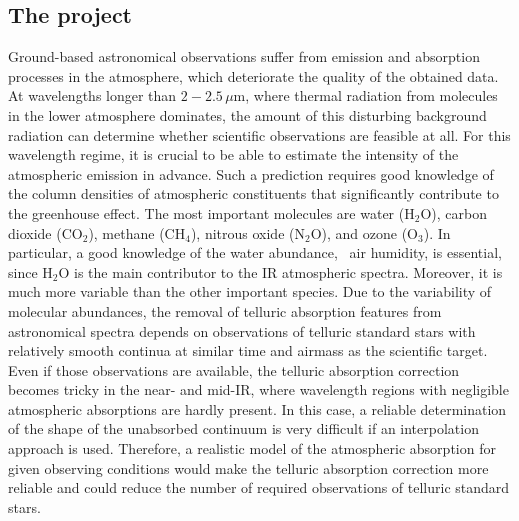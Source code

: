 \subsection{The project}\label{sec:project}
Ground-based astronomical observations suffer from emission and absorption
processes in the atmosphere, which deteriorate the quality of the obtained
data. At wavelengths longer than $2 - 2.5$\,$\mu$m, where thermal radiation
from molecules in the lower atmosphere dominates, the amount of this disturbing
background radiation can determine whether scientific observations are feasible
at all. For this wavelength regime, it is crucial to be able to estimate the
intensity of the atmospheric emission in advance. Such a prediction requires
good knowledge of the column densities of atmospheric constituents that
significantly contribute to the greenhouse effect. The most important molecules
are water (H$_2$O), carbon dioxide (CO$_2$), methane (CH$_4$), nitrous oxide
(N$_2$O), and ozone (O$_3$). In particular, a good knowledge of the water
abundance, \ie\ air humidity, is essential, since H$_2$O is the main
contributor to the IR atmospheric spectra. Moreover, it is much more variable
than the other important species. Due to the variability of molecular
abundances, the removal of telluric absorption features from astronomical
spectra depends on observations of telluric standard stars with relatively
smooth continua at similar time and airmass as the scientific target. Even if
those observations are available, the telluric absorption correction becomes
tricky in the near- and mid-IR, where wavelength regions with negligible
atmospheric absorptions are hardly present. In this case, a reliable
determination of the shape of the unabsorbed continuum is very difficult if
an interpolation approach is used. Therefore, a realistic model of the
atmospheric absorption for given observing conditions would make the telluric
absorption correction more reliable and could reduce the number of required
observations of telluric standard stars.

